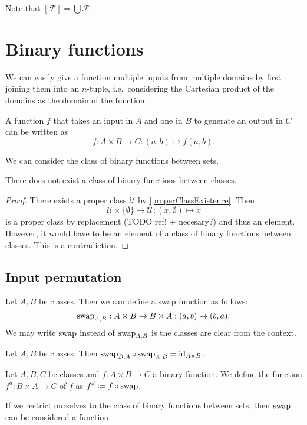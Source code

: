 Note that $[\mathcal{F}] = \bigcup\mathcal{F}$.

\section{Binary functions}
We can easily give a function multiple inputs from multiple domains by first joining them into an $n$-tuple, i.e.\ considering the Cartesian product of the domains as the domain of the function.

\begin{example}
A function $f$ that takes an input in $A$ and one in $B$ to generate an output in $C$ can be written as
\[ f: A\times B \to C: (a,b)\mapsto f(a,b). \]
\end{example}

We can consider the class of binary functions between sets.
\begin{lemma}
There does not exist a class of binary functions between classes.
\end{lemma}
\begin{proof}
There exists a proper class $\mathcal{U}$ by \ref{properClassExistence}. Then
\[ \mathcal{U}\times \{\emptyset\}\to \mathcal{U}: (x,\emptyset) \mapsto x \]
is a proper class by replacement (TODO ref! + necesary?) and thus an element. However, it would have to be an element of a class of binary functions between classes. This is a contradiction.
\end{proof}

\subsection{Input permutation}

Let $A,B$ be classes. Then we can define a swap function as follows:
\[ \operatorname{swap}_{A,B}: A\times B \to B\times A: (a,b) \mapsto (b,a). \]
We may write $\operatorname{swap}$ instead of $\operatorname{swap}_{A,B}$ is the classes are clear from the context.

\begin{lemma}
Let $A, B$ be classes. Then $\operatorname{swap}_{B,A}\circ \operatorname{swap}_{A,B} = \operatorname{id}_{A\times B}$.
\end{lemma}

\begin{definition}
Let $A, B, C$ be classes and $f: A\times B \to C$ a binary function. We define the  function $f^d: B\times A \to C$ of $f$ as $f^d \coloneqq f\circ \operatorname{swap}$. 
\end{definition}

If we restrict ourselves to the class of binary functions between sets, then $\operatorname{swap}$ can be considered a function.

